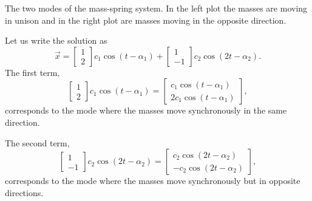 \documentclass{ximera}
\begin{document}
\begin{exampleSol}
    \begin{myfig}
        \capstart
        \caption{The two modes of the mass-spring system.  In the left plot the masses are moving in unison and in the right plot are masses moving in the opposite direction.\label{sosa:modesfig}}
    \end{myfig}
    
    Let us write the solution as
    \begin{equation*}
        \vec{x} = 
        \begin{bmatrix} 
            1 \\ 
            2 
        \end{bmatrix}
        c_1 \cos (t - \alpha_1 ) +
        \begin{bmatrix} 
            1 \\ 
            -1 
        \end{bmatrix}
        c_2 \cos (2t - \alpha_2 ) .
    \end{equation*}
    The first term,
    \begin{equation*}
        \begin{bmatrix} 
            1 \\ 
            2 
        \end{bmatrix}
        c_1 \cos (t - \alpha_1 ) =
        \begin{bmatrix}
            c_1 \cos (t - \alpha_1 ) \\
            2c_1 \cos (t - \alpha_1 )
        \end{bmatrix} ,
    \end{equation*}
    corresponds to the mode where the masses move synchronously in the same direction.
    
    The second term,
    \begin{equation*}
        \begin{bmatrix} 
            1 \\ 
            -1 
        \end{bmatrix}
        c_2 \cos (2t - \alpha_2 ) =
        \begin{bmatrix}
            c_2 \cos (2t - \alpha_2 ) \\
            - c_2 \cos (2t - \alpha_2 )
        \end{bmatrix} ,
    \end{equation*}
    corresponds to the mode where the masses move synchronously but in opposite directions.
    

\end{exampleSol}
\end{document}
